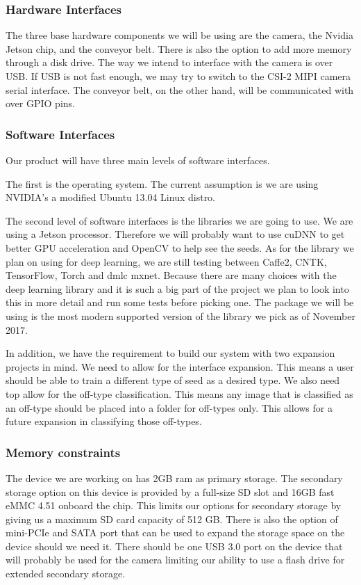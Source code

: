 \documentclass[onecolumn, draftclsnofoot,10pt, compsoc]{IEEEtran}
\begin{document}
	\subsubsection{Hardware Interfaces}
	The three base hardware components we will be using are the camera, the Nvidia Jetson chip, and the conveyor belt.
	There is also the option to add more memory through a disk drive.
	The way we intend to interface with the camera is over USB.
	If USB is not fast enough, we may try to switch to the CSI-2 MIPI camera serial interface.
	The conveyor belt, on the other hand, will be communicated with over GPIO pins.
	
	\subsubsection{Software Interfaces}
	Our product will have three main levels of software interfaces.
	
	The first is the operating system.
	The current assumption is we are using NVIDIA's a modified Ubuntu 13.04 Linux distro.
	
	The second level of software interfaces is the libraries we are going to use.
	We are using a Jetson processor. Therefore we will probably want to use cuDNN to get better GPU acceleration and OpenCV to help see the seeds.
	As for the library we plan on using for deep learning, we are still testing between Caffe2, CNTK, TensorFlow, Torch and dmlc mxnet.
	Because there are many choices with the deep learning library and it is such a big part of the project we plan to look into this in more detail and run some tests before picking one.
	The package we will be using is the most modern supported version of the library we pick as of November 2017.
	
	In addition, we have the requirement to build our system with two expansion projects in mind.
	We need to allow for the interface expansion. This means a user should be able to train a different type of seed as a desired type.
	We also need top allow for the off-type classification. This means any image that is classified as an off-type should be placed into a folder for off-types only. This allows for a future expansion in classifying those off-types.
	
	\subsubsection{Memory constraints}
	The device we are working on has 2GB ram as primary storage.
	The secondary storage option on this device is provided by a full-size SD slot and 16GB fast eMMC 4.51 onboard the chip.
	This limits our options for secondary storage by giving us a maximum SD card capacity of 512 GB. 
	There is also the option of mini-PCIe and SATA port that can be used to expand the storage space on the device should we need it.
	There should be one USB 3.0 port on the device that will probably be used for the camera limiting our ability to use a flash drive for extended secondary storage.
	
\end{document}
